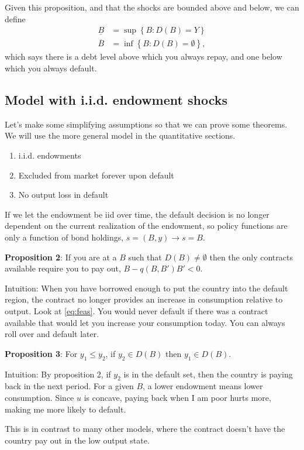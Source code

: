 \documentclass[11pt, pdftex]{article}
\begin{document}
Given this proposition, and that the shocks are bounded above and below, we can define
    \begin{align}
       \underline{B} &= \sup \left \{ B: D\left(B \right) = Y\right \} \\
      \overline{B} &= \inf \left \{ B: D\left(B \right) = \emptyset \right \},
    \end{align}
which says there is a debt level above which you always repay, and one below which you always default.

\subsection{Model with  i.i.d. endowment shocks}
Let's make some simplifying assumptions so that we can prove some theorems. We will use the more general model in the quantitative sections.
\begin{enumerate}[itemsep=0.0ex]
  \item i.i.d. endowments
  \item Excluded from market forever upon default
  \item No output loss in default
\end{enumerate}
If we let the endowment be iid over time, the default decision is no longer dependent on the current realization of the endowment, so policy functions are only a function of bond holdings, $s=(B,y) \rightarrow s=B$.

\textbf{Proposition 2}: If you are at a $B$ such that $D(B) \neq \emptyset$ then the only contracts available require you to pay out, $B-q(B,B')B'<0$.

Intuition: When you have borrowed enough to put the country into the default region, the contract no longer provides an increase in consumption relative to output. Look at \eqref{eq:feas}.  You would never default if there was a contract available that would let you increase your consumption today.  You can always roll over and default later.

\textbf{Proposition 3}: For $y_1 \leq y_2$, if $y_2 \in D(B)$ then $y_1 \in D(B)$.

Intuition: By proposition 2, if $y_2$ is in the default set, then the country is paying back in the next period.  For a given $B$, a lower endowment means lower consumption. Since $u$ is concave, paying back when I am poor hurts more, making me more likely to default.

This is in contrast to many  other models, where the contract doesn't have the country pay out in the low output state.
\end{document}

